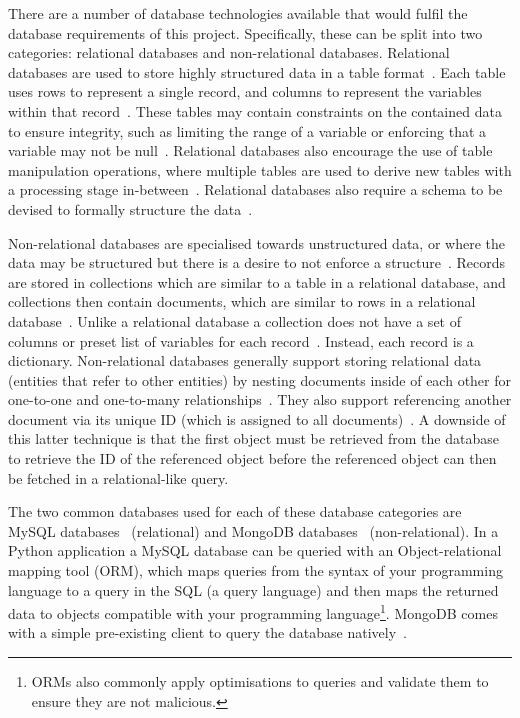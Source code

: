 \documentclass[authoryearcitations]{UoYCSproject}
\begin{document}
There are a number of database technologies available that would fulfil the database requirements of this project.  Specifically, these can be split into two categories: relational databases and non-relational databases. Relational databases are used to store highly structured data in a table format~\cite{introToDatabaseSys}. Each table uses rows to represent a single record, and columns to represent the variables within that record~\cite{introToDatabaseSys}. These tables may contain constraints on the contained data to ensure integrity, such as limiting the range of a variable or enforcing that a variable may not be null~\cite{introToDatabaseSys}. Relational databases also encourage the use of table manipulation operations, where multiple tables are used to derive new tables with a processing stage in-between~\cite{introToDatabaseSys}. Relational databases also require a schema to be devised to formally structure the data~\cite{Parker:2013:CNM:2498328.2500047}.

Non-relational databases are specialised towards unstructured data, or where the data may be structured but there is a desire to not enforce a structure~\cite{Parker:2013:CNM:2498328.2500047}. Records are stored in collections which are similar to a table in a relational database, and collections then contain documents, which are similar to rows in a relational database~\cite{Parker:2013:CNM:2498328.2500047}. Unlike a relational database a collection does not have a set of columns or preset list of variables for each record~\cite{Parker:2013:CNM:2498328.2500047}. Instead, each record is a dictionary. Non-relational databases generally support storing relational data (entities that refer to other entities) by nesting documents inside of each other for one-to-one and one-to-many relationships~\cite{Parker:2013:CNM:2498328.2500047}. They also support referencing another document via its unique ID (which is assigned to all documents)~\cite{Parker:2013:CNM:2498328.2500047}. A downside of this latter technique is that the first object must be retrieved from the database to retrieve the ID of the referenced object before the referenced object can then be fetched in a relational-like query.

The two common databases used for each of these database categories are MySQL databases~\cite{mySqlDb} (relational) and MongoDB databases~\cite{mongoDb} (non-relational). In a Python application a MySQL database can be queried with an Object-relational mapping tool (ORM), which maps queries from the syntax of your programming language to a query in the SQL (a query language) and then maps the returned data to objects compatible with your programming language\footnote{ORMs also commonly apply optimisations to queries and validate them to ensure they are not malicious.}. MongoDB comes with a simple pre-existing client to query the database natively~\cite{libraryPyMongo}.
\end{document}
